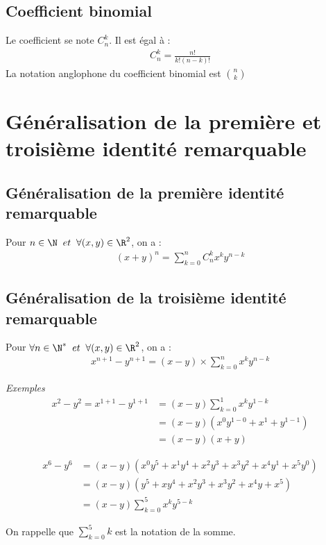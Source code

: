 \documentclass{report}
\begin{document}
\subsection{Coefficient binomial}
Le coefficient se note $C_n^k$. Il est égal à : \begin{gather}
    C_n^k = \frac{n!}{k!(n-k)!}
\end{gather}
La notation anglophone du coefficient binomial est $\binom{n}{k}$

\section{Généralisation de la première et troisième identité remarquable}

\subsection{Généralisation de la première identité remarquable}
Pour $n \in \N \; \; et \; \; \forall(x,y) \in \R^2$, on a :
\begin{gather}
    (x+y)^n = \sum_{k=0}^n C_n^k x^k y^{n-k}
\end{gather}

\subsection{Généralisation de la troisième identité remarquable}
Pour $\forall n \in \N^* \; \; et \; \;\forall (x,y) \in \R^2$, on a :
\begin{gather}
    x^{n+1} - y^{n+1} = (x-y) \times \sum_{k=0}^n x^k y^{n-k}
\end{gather}

\emph{Exemples}
\begin{align} 
    x^2 - y^2 = x^{1+1} - y^{1+1} 
    &= (x-y)\sum_{k=0}^1 x^k y^{1-k} \\ 
    &= (x-y)(x^0y^{1-0}+x^1+y^{1-1}) \\ 
    &= (x-y)(x+y)
\end{align}

\begin{align} 
    x^6-y^6 
    &= (x-y)(x^0y^5+x^1y^4+x^2y^3+x^3y^2+x^4y^1+x^5y^0) \\ 
    &= (x-y)(y^5+xy^4+x^2y^3+x^3y^2+x^4y+x^5) \\ &= (x-y) \sum_{k=0}^5 x^k y^{5-k} 
\end{align}

On rappelle que $\sum_{k=0}^5 k$ est la notation de la somme.
\end{document}
